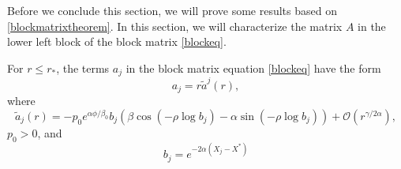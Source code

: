 \documentclass[thesis.tex]{subfiles}
\begin{document}
Before we conclude this section, we will prove some results based on \cref{blockmatrixtheorem}. In this section, we will characterize the matrix $A$ in the lower left block of the block matrix \cref{blockeq}. 

\begin{lemma}\label{lemma:ajparam}
For $r \leq r_*$, the terms $a_j$ in the block matrix equation \cref{blockeq} have the form
\[
a_j = r \tilde{a}^j(r),
\]
where
\begin{equation}\label{ajparam}
\tilde{a}_j(r) = -p_0 e^{\alpha \phi/\beta_0} b_j \left( \beta \cos\left(-\rho \log b_j \right) - \alpha \sin \left(-\rho \log b_j \right) \right) + \mathcal{O}(r^{\gamma/2\alpha}),
\end{equation}
$p_0 > 0$, and
\begin{equation}\label{bj2}
b_j = e^{-2 \alpha (X_j - X^*)}
\end{equation}


\end{lemma}
\end{document}
